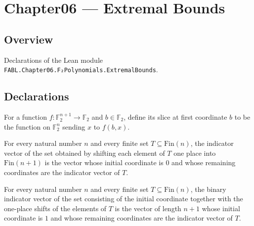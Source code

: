 \chapter{Chapter06 — Extremal Bounds}
\section{Overview}

Declarations of the Lean module \texttt{FABL.Chapter06.F₂Polynomials.ExtremalBounds}.

\section{Declarations}

\begin{definition}
\leanok
{}
For a function $f:\mathbb F_2^{n+1}\to\mathbb F_2$ and $b\in\mathbb F_2$, define
its slice at first coordinate $b$ to be the function on $\mathbb F_2^n$ sending $x$ to
$f(b,x)$.
\end{definition}

\begin{theorem}
\leanok
{}
For every natural number $n$ and every finite set $T\subseteq\mathrm{Fin}(n)$, the
indicator vector of the set obtained by shifting each element of $T$ one place into
$\mathrm{Fin}(n+1)$ is the vector whose initial coordinate is $0$ and whose remaining
coordinates are the indicator vector of $T$.
\end{theorem}

\begin{theorem}
\leanok
{}
For every natural number $n$ and every finite set $T\subseteq\mathrm{Fin}(n)$, the
binary indicator vector of the set consisting of the initial coordinate together with
the one-place shifts of the elements of $T$ is the vector of length $n+1$ whose initial
coordinate is $1$ and whose remaining coordinates are the indicator vector of $T$.
\end{theorem}

